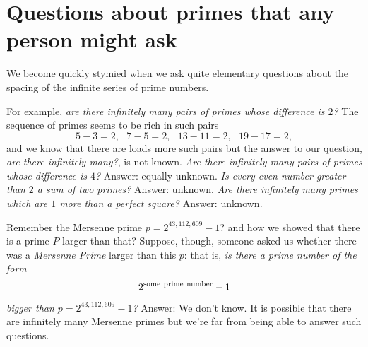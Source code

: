 \documentclass[11pt,draft]{article}
\theoremstyle{plain}
\theoremstyle{definition}
\numberwithin{equation}{section}
\numberwithin{figure}{section}
\numberwithin{table}{section}
\begin{document}



\section{Questions about primes that any person might ask}

We become quickly stymied when we ask quite elementary questions about
the spacing of the infinite series of prime numbers.

\bigskip

For example, {\em are there infinitely many pairs of primes whose
  difference is $2$?}  The sequence of primes seems to be rich in such
pairs $$5-3 =2,\ \ \ 7-5=2,\ \ \ 13-11=2,\ \ \ 19-17 =2,$$ and we know
that there are loads more such pairs but the answer to our question,
{\em are there infinitely many?}, is not known. {\em Are there
  infinitely many pairs of primes whose difference is $4$?}  Answer:
equally unknown. {\em Is every even number greater than $2$ a sum of
  two primes?}  Answer: unknown. {\em Are there infinitely many primes
  which are $1$ more than a perfect square?}  Answer: unknown.


\bigskip

Remember the Mersenne prime $p= 2^{43,112,609}-1$? and how we showed
that there is a prime $P$ larger than that? Suppose, though, someone
asked us whether there was a {\it Mersenne Prime} larger than this
$p$: that is, {\em is there a prime number of the form $$2^{\rm some\
  prime\ number}-1$$ bigger than $p= 2^{43,112,609}-1$?} Answer:  We don't
know. It is possible that there are infinitely many Mersenne primes
but we're far from being able to answer such questions.

\bigskip
\end{document}
